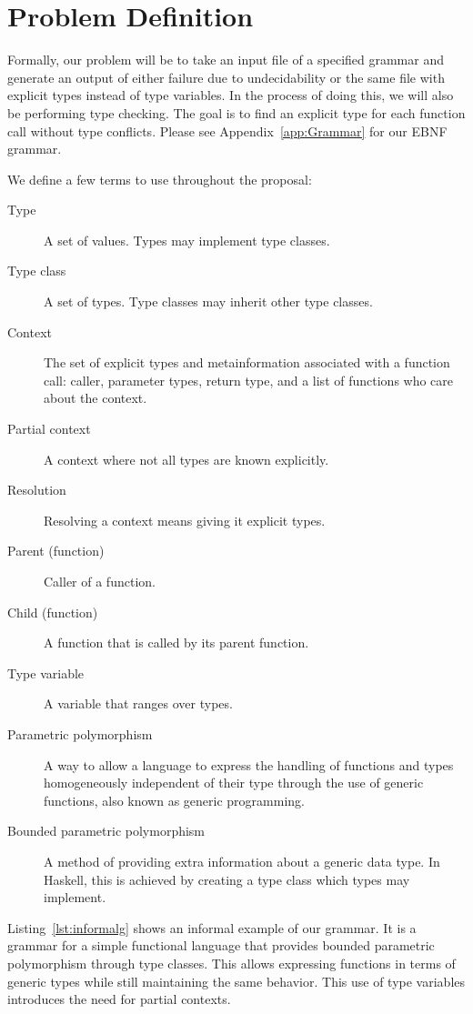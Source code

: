 \documentclass{acm_proc_article-sp}
\begin{document}
\section{Problem Definition}
\label{sec:problem}

Formally, our problem will be to take an input file of a specified grammar and
generate an output of either failure due to undecidability or the same file
with explicit types instead of type variables. In the process of doing this, we
will also be performing type checking. The goal is to find an explicit type for
each function call without type conflicts. Please see Appendix~\ref{app:Grammar}
for our EBNF grammar.

We define a few terms to use throughout the proposal:
\begin{description}
	\item[Type] A set of values. Types may implement type classes.
	\item[Type class] A set of types. Type classes may inherit other type classes.
	\item[Context] The set of explicit types and metainformation associated
		with a function call: caller, parameter types, return type,
		and a list of functions who care about the context.
	\item[Partial context] A context where not all types are known explicitly.
	\item[Resolution] Resolving a context means giving it explicit types.
	\item[Parent (function)] Caller of a function.
	\item[Child (function)] A function that is called by its parent function.
	\item[Type variable] A variable that ranges over types.
	\item[Parametric polymorphism] A way to allow a language to express the
		handling of functions and types homogeneously independent of their type
		through the use of generic functions, also known as generic
		programming.
	\item[Bounded parametric polymorphism] A method of providing extra
		information about a generic data type. In Haskell, this is achieved by
		creating a type class which types may implement.
\end{description}

Listing~\ref{lst:informalg} shows an informal example of our grammar. It is a
grammar for a simple functional language that provides bounded parametric
polymorphism through type classes. This allows expressing functions in terms of
generic types while still maintaining the same behavior. This use of type
variables introduces the need for partial contexts.
\end{document}
